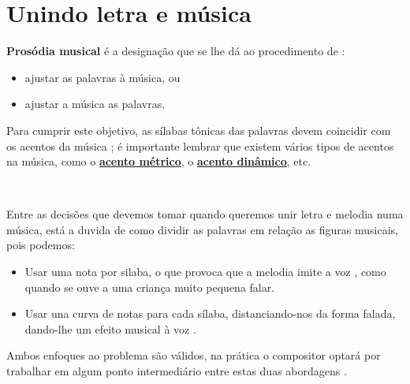 \section{Unindo letra e música}
\label{sec:ProsodiaMusical}
\textbf{Prosódia musical} é a designação que se lhe dá ao procedimento de \cite[pp. 336]{medteoria}:
\begin{itemize}
\item ajustar as palavras à música, ou 
\item ajustar a música as palavras.
\end{itemize}

Para cumprir este objetivo, 
as sílabas tônicas das palavras devem coincidir com os acentos da música \cite[pp. 149]{medteoria} \cite[pp. 60]{howard1991aprendendo};
é importante lembrar que existem vários tipos de acentos na música,
como o \hyperref[def:acentometrico]{\textbf{acento métrico}}, 
o \hyperref[def:acentodinamico]{\textbf{acento dinâmico}}, etc.

~

Entre as decisões que devemos tomar quando queremos unir letra e melodia numa música, 
está a duvida de como dividir as palavras em relação as figuras musicais, pois podemos:
\begin{itemize}
\item Usar uma nota por silaba, 
o que provoca que a melodia imite a voz \cite[pp. 60]{howard1991aprendendo},
como quando se ouve a uma criança muito pequena falar.
\item Usar una curva de notas para cada sílaba, 
distanciando-nos da forma falada, dando-lhe um efeito musical à voz \cite[pp. 60]{howard1991aprendendo}. 
\end{itemize}
Ambos enfoques ao problema são válidos, 
na prática o compositor optará por trabalhar em algum ponto intermediário
entre estas duas abordagens \cite[pp. 60]{howard1991aprendendo}.



